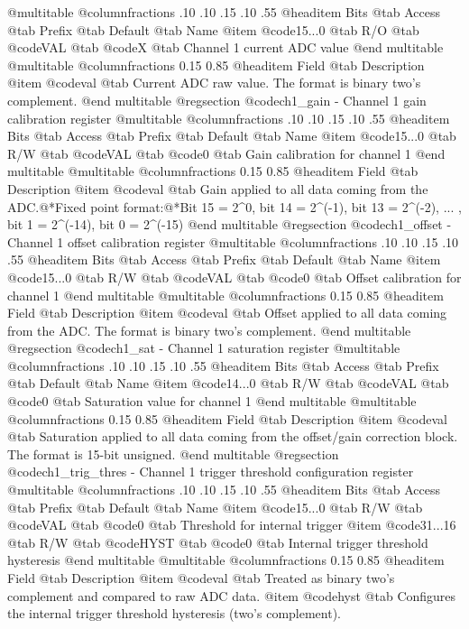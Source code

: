 @multitable @columnfractions .10 .10 .15 .10 .55
@headitem Bits @tab Access @tab Prefix @tab Default @tab Name
@item @code{15...0}
@tab R/O @tab
@code{VAL}
@tab @code{X} @tab 
Channel 1 current ADC value
@end multitable
@multitable @columnfractions 0.15 0.85
@headitem Field @tab Description
@item @code{val} @tab Current ADC raw value. The format is binary two's complement.
@end multitable
@regsection @code{ch1_gain} - Channel 1 gain calibration register
@multitable @columnfractions .10 .10 .15 .10 .55
@headitem Bits @tab Access @tab Prefix @tab Default @tab Name
@item @code{15...0}
@tab R/W @tab
@code{VAL}
@tab @code{0} @tab 
Gain calibration for channel 1
@end multitable
@multitable @columnfractions 0.15 0.85
@headitem Field @tab Description
@item @code{val} @tab Gain applied to all data coming from the ADC.@*Fixed point format:@*Bit 15 = 2^0, bit 14 = 2^(-1), bit 13 = 2^(-2), ... , bit 1 = 2^(-14), bit 0 = 2^(-15)
@end multitable
@regsection @code{ch1_offset} - Channel 1 offset calibration register
@multitable @columnfractions .10 .10 .15 .10 .55
@headitem Bits @tab Access @tab Prefix @tab Default @tab Name
@item @code{15...0}
@tab R/W @tab
@code{VAL}
@tab @code{0} @tab 
Offset calibration for channel 1
@end multitable
@multitable @columnfractions 0.15 0.85
@headitem Field @tab Description
@item @code{val} @tab Offset applied to all data coming from the ADC. The format is binary two's complement.
@end multitable
@regsection @code{ch1_sat} - Channel 1 saturation register
@multitable @columnfractions .10 .10 .15 .10 .55
@headitem Bits @tab Access @tab Prefix @tab Default @tab Name
@item @code{14...0}
@tab R/W @tab
@code{VAL}
@tab @code{0} @tab 
Saturation value for channel 1
@end multitable
@multitable @columnfractions 0.15 0.85
@headitem Field @tab Description
@item @code{val} @tab Saturation applied to all data coming from the offset/gain correction block. The format is 15-bit unsigned.
@end multitable
@regsection @code{ch1_trig_thres} - Channel 1 trigger threshold configuration register
@multitable @columnfractions .10 .10 .15 .10 .55
@headitem Bits @tab Access @tab Prefix @tab Default @tab Name
@item @code{15...0}
@tab R/W @tab
@code{VAL}
@tab @code{0} @tab 
Threshold for internal trigger
@item @code{31...16}
@tab R/W @tab
@code{HYST}
@tab @code{0} @tab 
Internal trigger threshold hysteresis
@end multitable
@multitable @columnfractions 0.15 0.85
@headitem Field @tab Description
@item @code{val} @tab Treated as binary two's complement and compared to raw ADC data.
@item @code{hyst} @tab Configures the internal trigger threshold hysteresis (two's complement).
